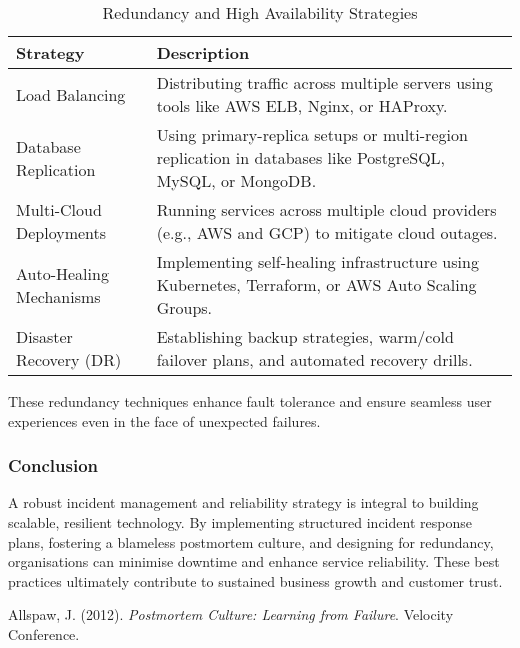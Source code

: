 \begin{table}[h]
    \centering
    \begin{tabular}{|l|p{10cm}|}
        \hline
        \textbf{Strategy}       & \textbf{Description}                                                                                      \\
        \hline
        Load Balancing          & Distributing traffic across multiple servers using tools like AWS ELB, Nginx, or HAProxy.                 \\
        \hline
        Database Replication    & Using primary-replica setups or multi-region replication in databases like PostgreSQL, MySQL, or MongoDB. \\
        \hline
        Multi-Cloud Deployments & Running services across multiple cloud providers (e.g., AWS and GCP) to mitigate cloud outages.           \\
        \hline
        Auto-Healing Mechanisms & Implementing self-healing infrastructure using Kubernetes, Terraform, or AWS Auto Scaling Groups.         \\
        \hline
        Disaster Recovery (DR)  & Establishing backup strategies, warm/cold failover plans, and automated recovery drills.                  \\
        \hline
    \end{tabular}
    \caption{Redundancy and High Availability Strategies}
    \label{tab:redundancy-strategies}
\end{table}

These redundancy techniques enhance fault tolerance and ensure seamless user experiences even in the face of unexpected failures.

\subsubsection{Conclusion}

A robust incident management and reliability strategy is integral to building scalable, resilient technology. By implementing structured incident response plans, fostering a blameless postmortem culture, and designing for redundancy, organisations can minimise downtime and enhance service reliability. These best practices ultimately contribute to sustained business growth and customer trust.


\begin{thebibliography}{9}
     Allspaw, J. (2012). \textit{Postmortem Culture: Learning from Failure}. Velocity Conference.
\end{thebibliography}

